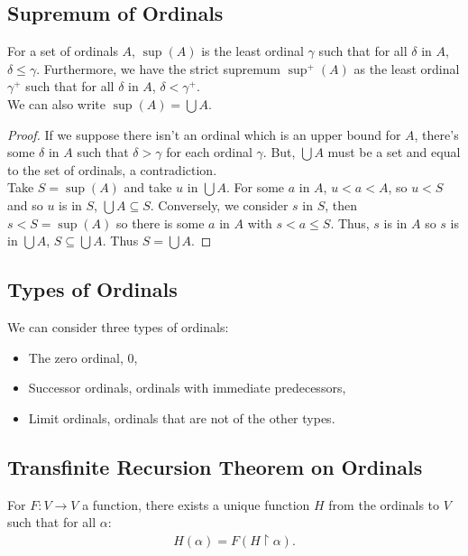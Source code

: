 \subsection{Supremum of Ordinals}

For a set of ordinals $A$, $\sup(A)$ is the least ordinal $\gamma$ 
such that for all $\delta$ in $A$, $\delta \leq \gamma$. Furthermore,
we have the strict supremum $\sup^+(A)$ as the least ordinal $\gamma^+$
such that for all $\delta$ in $A$, $\delta < \gamma^+$.
\\[\baselineskip]
We can also write $\sup(A) = \bigcup A$.
\begin{proof}
    If we suppose there isn't an ordinal which is an upper bound
    for $A$, there's some $\delta$ in $A$ such that $\delta > \gamma$
    for each ordinal $\gamma$. But, $\bigcup A$ must be a set and equal to
    the set of ordinals, a contradiction.
    \\[\baselineskip]
    Take $S = \sup(A)$ and take $u$ in $\bigcup A$. For some $a$ in $A$,
    $u < a < A$, so $u < S$ and so $u$ is in $S$, $\bigcup A \subseteq S$.
    Conversely, we consider $s$ in $S$, then $s < S = \sup(A)$ so there
    is some $a$ in $A$ with $s < a \leq S$. Thus, $s$ is in $A$ so
    $s$ is in $\bigcup A$, $S \subseteq \bigcup A$. Thus $S = \bigcup A$.
\end{proof}

\subsection{Types of Ordinals}

We can consider three types of ordinals: \begin{itemize}
    \item The zero ordinal, $0$,
    \item Successor ordinals, ordinals with immediate predecessors,
    \item Limit ordinals, ordinals that are not of the other types.
\end{itemize}

\subsection{Transfinite Recursion Theorem on Ordinals}

For $F : V \to V$ a function, there exists a unique function
$H$ from the ordinals to $V$ such that for all $\alpha$: \begin{align*}
    H(\alpha) = F(H \upharpoonright \alpha).
\end{align*}

